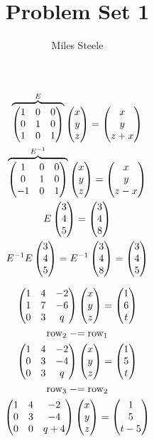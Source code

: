 \documentclass{mshw}
\begin{document}
\title{Problem Set 1}
\author{Miles Steele}

\begin{gather*}
\overbrace{
  \begin{pmatrix}
    1 & 0 & 0 \\
    0 & 1 & 0 \\
    1 & 0 & 1 \\
  \end{pmatrix}
}^E
\begin{pmatrix} x \\ y \\ z \end{pmatrix} = \begin{pmatrix} x \\ y \\ z + x \end{pmatrix}
\\
\overbrace{
  \begin{pmatrix}
    1 & 0 & 0 \\
    0 & 1 & 0 \\
    -1 & 0 & 1 \\
  \end{pmatrix}
}^{E^{-1}}
\begin{pmatrix} x \\ y \\ z \end{pmatrix} = \begin{pmatrix} x \\ y \\ z - x \end{pmatrix}
\\
E \begin{pmatrix} 3 \\ 4 \\ 5 \end{pmatrix} = \begin{pmatrix} 3 \\ 4 \\ 8 \end{pmatrix}
\\
E^{-1} E \begin{pmatrix} 3 \\ 4 \\ 5 \end{pmatrix}
= E^{-1} \begin{pmatrix} 3 \\ 4 \\ 8 \end{pmatrix}
= \begin{pmatrix} 3 \\ 4 \\ 5 \end{pmatrix}
\end{gather*}

\begin{gather*}
\begin{pmatrix}
  1 & 4 & -2 \\
  1 & 7 & -6 \\
  0 & 3 & q \\
\end{pmatrix}
\begin{pmatrix} x \\ y \\ z \end{pmatrix}
= \begin{pmatrix} 1 \\ 6 \\ t \end{pmatrix}
\\
\text{row}_2 \mathrel{{-}{=}} \text{row}_1
\\
\begin{pmatrix}
  1 & 4 & -2 \\
  0 & 3 & -4 \\
  0 & 3 & q \\
\end{pmatrix}
\begin{pmatrix} x \\ y \\ z \end{pmatrix}
= \begin{pmatrix} 1 \\ 5 \\ t \end{pmatrix}
\\
\text{row}_3 \mathrel{{-}{=}} \text{row}_2
\\
\begin{pmatrix}
  1 & 4 & -2 \\
  0 & 3 & -4 \\
  0 & 0 & q + 4 \\
\end{pmatrix}
\begin{pmatrix} x \\ y \\ z \end{pmatrix}
= \begin{pmatrix} 1 \\ 5 \\ t-5 \end{pmatrix}
\end{gather*}
\end{document}
